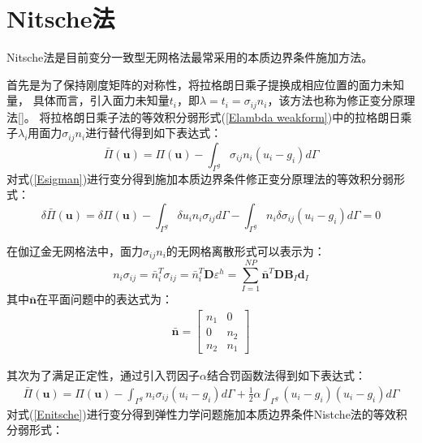 \section{Nitsche法}
Nitsche法\cite{}是目前变分一致型无网格法最常采用的本质边界条件施加方法。\par
首先是为了保持刚度矩阵的对称性，将拉格朗日乘子提换成相应位置的面力未知量，
具体而言，引入面力未知量$t_i$，即$\lambda=t_i=\sigma_{ij}n_i$，该方法也称为修正变分原理法[]。
将拉格朗日乘子法的等效积分弱形式(\ref{Elambda weakform})中的拉格朗日乘子$\lambda_i$用面力$\sigma_{ij}n_i$进行替代得到如下表达式：
\begin{equation}\label{Esigman}
    \bar{\Pi}(\pmb{u})=\Pi(\pmb{u})-\int_{\Gamma^g}\sigma_{ij}n_i(u_i-g_i)d\Gamma
\end{equation}
对式(\ref{Esigman})进行变分得到施加本质边界条件修正变分原理法的等效积分弱形式：
\begin{equation}\label{Esigman weakform}
    \delta\bar{\Pi}(\pmb{u})=\delta\Pi(\pmb{u})-\int_{\Gamma^g}\delta u_in_i\sigma_{ij}d\Gamma-\int_{\Gamma^g}n_i\delta\sigma_{ij}(u_i-g_i)d\Gamma
    =0
\end{equation}\par
在伽辽金无网格法中，面力$\sigma_{ij}n_i$的无网格离散形式可以表示为：
\begin{equation}\label{Esigman wuwanggelisan}
    n_i\sigma_{ij}=\bar{n}_i^T\sigma_{ij}=\bar{n}_i^T\pmb{D}\varepsilon^h=\sum_{I=1}^{N\!P}\bar{\pmb n}^T\pmb D\pmb{B}_I\pmb{d}_I
\end{equation}
其中$\bar{\pmb{n}}$在平面问题中的表达式为：
\begin{equation}
\begin{split}
    \bar{\pmb n}=\left[\begin{matrix}n_1&0\\0&n_2\\n_2&n_1
    \end{matrix}\right]
\end{split}
\end{equation}\par
其次为了满足正定性，通过引入罚因子$\alpha$结合罚函数法得到如下表达式：
\begin{equation}\label{Enitsche}
\begin{split}
    \bar{\Pi}(\pmb{u})=\Pi(\pmb{u})-\int_{\Gamma^g}n_i\sigma_{ij}(u_i-g_i)d\Gamma+\frac{1}{2}\alpha\int_{\Gamma^g}(u_i-g_i)(u_i-g_i)d\Gamma
\end{split}
\end{equation}
对式(\ref{Enitsche})进行变分得到弹性力学问题施加本质边界条件Nistche法的等效积分弱形式：
